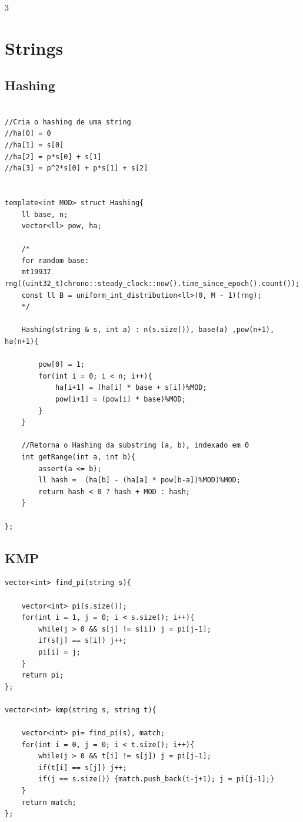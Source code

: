 \documentclass[9pt, a4paper, notitlepage]{extreport}
\begin{document}
\begin{multicols}{3}
%
%

\section{Strings}

\subsection{Hashing}
\begin{verbatim}

//Cria o hashing de uma string
//ha[0] = 0
//ha[1] = s[0]
//ha[2] = p*s[0] + s[1]
//ha[3] = p^2*s[0] + p*s[1] + s[2]


template<int MOD> struct Hashing{
    ll base, n;
    vector<ll> pow, ha; 

    /*
    for random base:
    mt19937 rng((uint32_t)chrono::steady_clock::now().time_since_epoch().count());
    const ll B = uniform_int_distribution<ll>(0, M - 1)(rng);
    */

    Hashing(string & s, int a) : n(s.size()), base(a) ,pow(n+1), ha(n+1){

        pow[0] = 1;
        for(int i = 0; i < n; i++){
            ha[i+1] = (ha[i] * base + s[i])%MOD;
            pow[i+1] = (pow[i] * base)%MOD;
        }
    }
    
    //Retorna o Hashing da substring [a, b), indexado em 0
    int getRange(int a, int b){
        assert(a <= b);
        ll hash =  (ha[b] - (ha[a] * pow[b-a])%MOD)%MOD;
        return hash < 0 ? hash + MOD : hash;
    }
    
};
\end{verbatim}

\subsection{KMP}
\begin{verbatim}
vector<int> find_pi(string s){

    vector<int> pi(s.size());
    for(int i = 1, j = 0; i < s.size(); i++){
        while(j > 0 && s[j] != s[i]) j = pi[j-1];
        if(s[j] == s[i]) j++;
        pi[i] = j;
    }
    return pi;
};

vector<int> kmp(string s, string t){
    
    vector<int> pi= find_pi(s), match;
    for(int i = 0, j = 0; i < t.size(); i++){
        while(j > 0 && t[i] != s[j]) j = pi[j-1];
        if(t[i] == s[j]) j++;
        if(j == s.size()) {match.push_back(i-j+1); j = pi[j-1];}
    }
    return match;
};


\end{verbatim}
\end{multicols}
\end{document}
